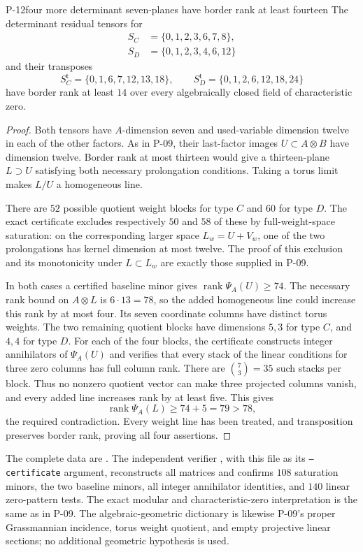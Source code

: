 
\begin{finding}{P-12}{four more determinant seven-planes have border rank at least fourteen}
The determinant residual tensors for
\[
 \begin{split}
 S_C&=\{0,1,2,3,6,7,8\},\\
 S_D&=\{0,1,2,3,4,6,12\}
 \end{split}
\]
and their transposes
\[
 S_C^{\mathsf t}=\{0,1,6,7,12,13,18\},\qquad
 S_D^{\mathsf t}=\{0,1,2,6,12,18,24\}
\]
have border rank at least \(14\) over every algebraically
closed field of characteristic zero.
\end{finding}
\begin{proof}
Both tensors have \(A\)-dimension seven and used-variable
dimension twelve in each of the other factors. As in P-09,
their last-factor images \(U\subset A\otimes B\) have
dimension twelve. Border rank at most thirteen would give
a thirteen-plane \(L\supset U\) satisfying both necessary
prolongation conditions. Taking a torus limit makes
\(L/U\) a homogeneous line.

There are \(52\) possible quotient weight blocks for
type \(C\) and \(60\) for type \(D\). The exact certificate
excludes respectively \(50\) and \(58\) of these by
full-weight-space saturation: on the corresponding
larger space \(L_w=U+V_w\), one of the two prolongations
has kernel dimension at most twelve. The proof of this
exclusion and its monotonicity under \(L\subset L_w\)
are exactly those supplied in P-09.

In both cases a certified baseline minor gives
\(\operatorname{rank}\Psi_A(U)\geq74\). The necessary
rank bound on \(A\otimes L\) is \(6\cdot13=78\), so
the added homogeneous line could increase this rank
by at most four. Its seven coordinate columns have
distinct torus weights. The two remaining quotient
blocks have dimensions \(5,3\) for type \(C\), and
\(4,4\) for type \(D\). For each of the four blocks,
the certificate constructs integer annihilators of
\(\Psi_A(U)\) and verifies that every stack of the
linear conditions for three zero columns has full
column rank. There are \(\binom73=35\) such stacks
per block. Thus no nonzero quotient vector can make
three projected columns vanish, and every added line
increases rank by at least five. This gives
\[
 \operatorname{rank}\Psi_A(L)\geq74+5=79>78,
 \]
the required contradiction.
Every weight line has been treated, and transposition
preserves border rank, proving all four assertions.
\end{proof}

The complete data are
.
The independent verifier
, with this file as
its \texttt{--certificate} argument, reconstructs all
matrices and confirms \(108\) saturation minors,
the two baseline minors, all integer annihilator
identities, and \(140\) linear zero-pattern tests.
The exact modular and characteristic-zero interpretation
is the same as in P-09. The algebraic-geometric dictionary
is likewise P-09's proper Grassmannian incidence,
torus weight quotient, and empty projective linear
sections; no additional geometric hypothesis is used.
